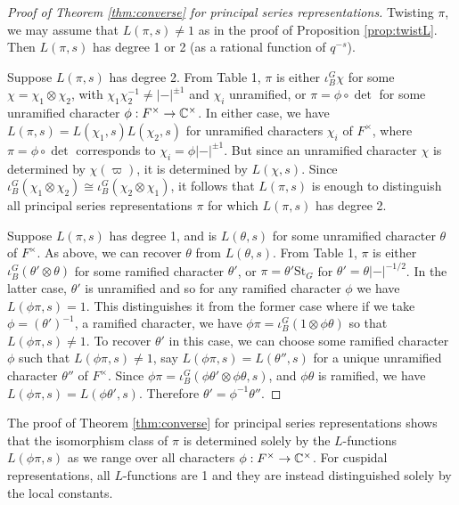 \begin{proof}[Proof of Theorem \ref{thm:converse} for principal series representations]
    Twisting $\pi$, we may assume that $L(\pi,s) \neq 1$ as in the proof of Proposition \ref{prop:twistL}. Then $L(\pi,s)$ has degree 1 or 2 (as a rational function of $q^{-s}$). 

    Suppose $L(\pi,s)$ has degree 2. From Table 1, $\pi$ is either $\iota_B^G \chi$ for some $\chi=\chi_1 \otimes \chi_2$, with $\chi_1\chi_2^{-1} \neq |-|^{\pm 1}$ and $\chi_i$ unramified, or $\pi = \phi \circ \det$ for some unramified character $\phi :F^\times \to \mathbb{C}^\times$. In either case, we have $L(\pi,s)=L(\chi_1,s)L(\chi_2,s)$ for unramified characters $\chi_i$ of $F^\times$, where $\pi = \phi \circ \det$ corresponds to $\chi_i = \phi |-|^{\pm 1}$. But since an unramified character $\chi$ is determined by $\chi(\varpi)$, it is determined by $L(\chi,s)$. Since $\iota_B^G( \chi_1 \otimes \chi_2) \cong \iota_B^G (\chi_2 \otimes \chi_1)$, it follows that $L(\pi,s)$ is enough to distinguish all principal series representations $\pi$ for which $L(\pi,s)$ has degree 2.

    Suppose $L(\pi,s)$ has degree 1, and is $L(\theta,s)$ for some unramified character $\theta$ of $F^\times$. As above, we can recover $\theta$ from $L(\theta,s)$. From Table 1, $\pi$ is either $\iota_B^G (\theta' \otimes \theta)$ for some ramified character $\theta'$, or $\pi = \theta' \mathrm{St}_G$ for $\theta' = \theta|-|^{-1/2}$. In the latter case, $\theta'$ is unramified and so for any ramified character $\phi$ we have $L(\phi\pi,s)=1$. This distinguishes it from the former case where if we take $\phi = (\theta')^{-1}$, a ramified character, we have $\phi\pi = \iota_B^G (1 \otimes \phi\theta)$ so that $L(\phi\pi,s) \neq 1$. To recover $\theta'$ in this case, we can choose some ramified character $\phi$ such that $L(\phi\pi,s) \neq 1$, say $L(\phi\pi,s) = L(\theta'',s)$ for a unique unramified character $\theta''$ of $F^\times$. Since $\phi\pi = \iota_B^G (\phi\theta' \otimes \phi\theta,s)$, and $\phi\theta$ is ramified, we have $L(\phi\pi,s) = L(\phi\theta',s)$. Therefore $\theta' = \phi^{-1}\theta''$.
\end{proof}

\begin{rem}
    The proof of Theorem \ref{thm:converse} for principal series representations shows that the isomorphism class of $\pi$ is determined solely by the $L$-functions $L(\phi\pi,s)$ as we range over all characters $\phi :F^\times \to \mathbb{C}^\times$. For cuspidal representations, all $L$-functions are 1 and they are instead distinguished solely by the local constants.
\end{rem}




